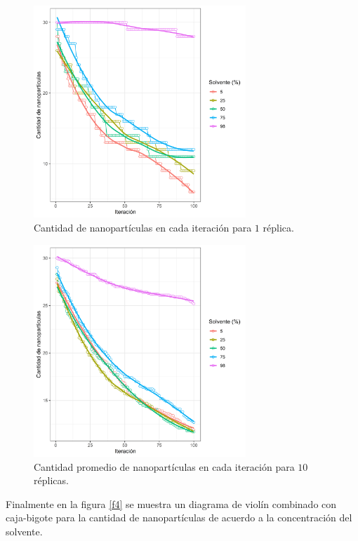 \documentclass[3p,times,twocolumn]{elsarticle}
\begin{document}
\begin{figure} [h!]%
    \centering
    \includegraphics[width=80mm]{Figura_22.png} %
    \caption{Cantidad de nanopartículas en cada iteración para $1$ réplica.}
    \label{f2}
\end{figure} 

\newpage
\begin{figure} [h!]%
    \centering
    \includegraphics[width=80mm]{Figura_2.png} %
    \caption{Cantidad promedio de nanopartículas en cada iteración para $10$ réplicas.}
    \label{f3}
\end{figure} 

Finalmente en la figura \ref{f4} se muestra un diagrama de violín combinado con caja-bigote para la cantidad de nanopartículas de acuerdo a la concentración del solvente. 
\end{document}
